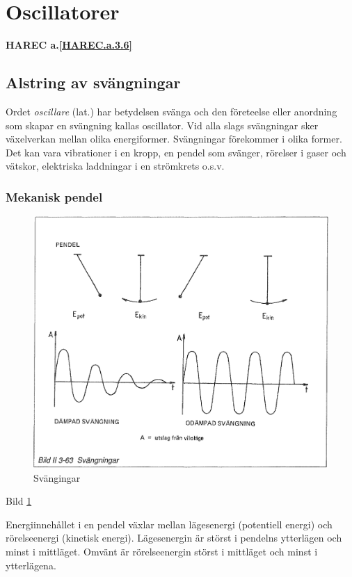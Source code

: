 \section{Oscillatorer}
\textbf{HAREC a.\ref{HAREC.a.3.6}\label{myHAREC.a.3.6}}
\label{oscillatorer}

\subsection{Alstring av svängningar}
Ordet \emph{oscillare} (lat.) har betydelsen svänga och den företeelse
eller anordning som skapar en svängning kallas oscillator. Vid alla
slags svängningar sker växelverkan mellan olika
energiformer. Svängningar förekommer i olika former. Det kan vara
vibrationer i en kropp, en pendel som svänger, rörelser i gaser och
vätskor, elektriska laddningar i en strömkrets o.s.v.

\subsubsection{Mekanisk pendel}

\begin{figure}
\includegraphics[width=\textwidth]{images/bild_2_3-63}
\caption{Svängingar}
\label{fig:BildII3-63}
\end{figure}

Bild \ref{fig:BildII3-63}

Energiinnehållet i en pendel växlar mellan lägesenergi (potentiell
energi) och rörelseenergi (kinetisk energi). Lägesenergin är störst i
pendelns ytterlägen och minst i mittläget. Omvänt är rörelseenergin
störst i mittläget och minst i ytterlägena.

